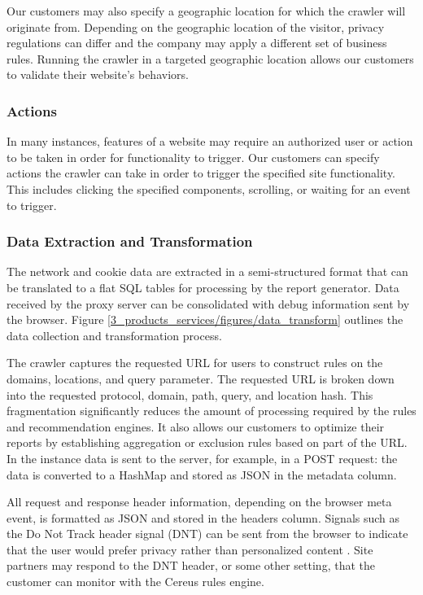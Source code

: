 Our customers may also specify a geographic location for which the crawler will originate from. Depending on the geographic location of the visitor, privacy regulations can differ and the company may apply a different set of business rules. Running the crawler in a targeted geographic location allows our customers to validate their website's behaviors.

\subsubsection*{Actions}

In many instances, features of a website may require an authorized user or action to be taken in order for functionality to trigger. Our customers can specify actions the crawler can take in order to trigger the specified site functionality. This includes clicking the specified components, scrolling, or waiting for an event to trigger.

\subsubsection*{Data Extraction and Transformation}

The network and cookie data are extracted in a semi-structured format that can be translated to a flat SQL tables for processing by the report generator. Data received by the proxy server can be consolidated with debug information sent by the browser. Figure \ref{3_products_services/figures/data_transform} outlines the data collection and transformation process.

The crawler captures the requested URL for users to construct rules on the domains, locations, and query parameter. The requested URL is broken down into the requested protocol, domain, path, query, and location hash. This fragmentation significantly reduces the amount of processing required by the rules and recommendation engines. It also allows our customers to optimize their reports by establishing aggregation or exclusion rules based on part of the URL. In the instance data is sent to the server, for example, in a POST request: the data is converted to a HashMap and stored as JSON in the metadata column.

All request and response header information, depending on the browser meta event, is formatted as JSON and stored in the headers column. Signals such as the Do Not Track header signal (DNT) can be sent from the browser to indicate that the user would prefer privacy rather than personalized content \cite{mdn.2020}. Site partners may respond to the DNT header, or some other setting, that the customer can monitor with the Cereus rules engine.

